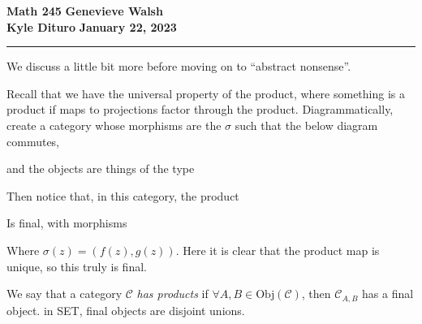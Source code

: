 \documentclass[12pt, twosided]{article}
\begin{document}
\noindent \textbf{Math 245} \hfill \textbf{Genevieve Walsh} \\
\textbf{Kyle Dituro} \hfill \textbf{January 22\ndt, 2023}\hrule
\vspace{.2in}

We discuss a little bit more before moving on to ``abstract nonsense''.

Recall that we have the universal property of the product, where something is a product if maps to projections factor through the product. Diagrammatically, create a category whose morphisms are the \(\sigma\) such that the below diagram commutes,

\begin{center}
\end{center}

and the objects are things of the type
\begin{center}
\end{center}

Then notice that, in this category, the product

\begin{center}
\end{center}

Is final, with morphisms

\begin{center}
\end{center}

Where \(\sigma(z) = (f(z), g(z))\). Here it is clear that the product map is unique, so this truly is final.

\begin{df}
  We say that a category \(\mathcal{C}\) \textit{has products} if \(\forall A, B \in \mathrm{Obj}(\mathcal{C})\), then \(\mathcal{C}_{A, B}\) has a final object. in SET, final objects are disjoint unions.
\end{df}
\end{document}
